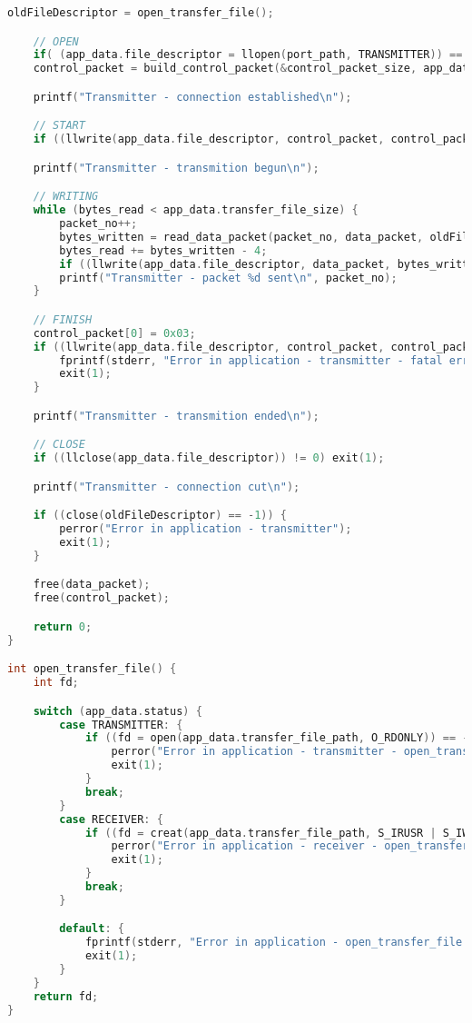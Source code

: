 \begin{lstlisting}[language=C, caption=application.c]
    oldFileDescriptor = open_transfer_file();

    // OPEN
    if( (app_data.file_descriptor = llopen(port_path, TRANSMITTER)) == -1) exit(1);
    control_packet = build_control_packet(&control_packet_size, app_data.transfer_file_name);

    printf("Transmitter - connection established\n");

    // START
    if ((llwrite(app_data.file_descriptor, control_packet, control_packet_size)) == -1) exit(1); 

    printf("Transmitter - transmition begun\n");

    // WRITING
    while (bytes_read < app_data.transfer_file_size) {
        packet_no++;
        bytes_written = read_data_packet(packet_no, data_packet, oldFileDescriptor, bytes_read);
        bytes_read += bytes_written - 4;
        if ((llwrite(app_data.file_descriptor, data_packet, bytes_written)) == -1) exit(1);
        printf("Transmitter - packet %d sent\n", packet_no);
    }

    // FINISH
    control_packet[0] = 0x03;
    if ((llwrite(app_data.file_descriptor, control_packet, control_packet_size)) == -1) {
        fprintf(stderr, "Error in application - transmitter - fatal error when writting control packet\n");
        exit(1);
    } 

    printf("Transmitter - transmition ended\n");

    // CLOSE
    if ((llclose(app_data.file_descriptor)) != 0) exit(1);

    printf("Transmitter - connection cut\n");

    if ((close(oldFileDescriptor) == -1)) {
        perror("Error in application - transmitter");
        exit(1);
    }

    free(data_packet);
    free(control_packet);  

    return 0;
}

int open_transfer_file() {
    int fd;

    switch (app_data.status) {
        case TRANSMITTER: {
            if ((fd = open(app_data.transfer_file_path, O_RDONLY)) == -1) {
                perror("Error in application - transmitter - open_transfer_file");
                exit(1);
            }
            break;
        }
        case RECEIVER: {
            if ((fd = creat(app_data.transfer_file_path, S_IRUSR | S_IWUSR | S_IRGRP | S_IROTH)) == -1) {
                perror("Error in application - receiver - open_transfer_file");
                exit(1);
            }
            break;
        }

        default: {
            fprintf(stderr, "Error in application - open_transfer_file: wrong type of connection\n");
            exit(1);
        }
    }
    return fd;
}
\end{lstlisting}

